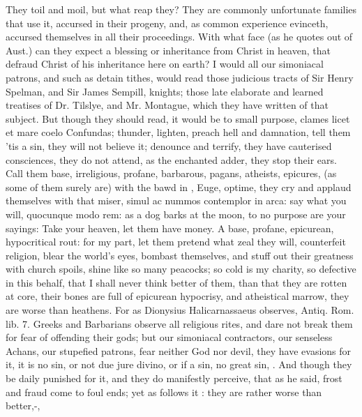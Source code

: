 {They toil and moil, but what reap they? They are commonly unfortunate
families that use it, accursed in their pro\-geny, and, as common
experience evinceth, accursed themselves in all their proceedings. With
what face (as he quotes out of Aust.) can they expect a blessing
or inheritance from Christ in heaven, that defraud Christ of his
inheritance here on earth? I would all our simoniacal patrons, and such
as detain tithes, would read those judicious tracts of Sir Henry
Spelman, and Sir James Sempill, knights; those late elaborate and
learned treatises of Dr. Tilslye, and Mr. Montague, which they have
written of that subject. But though they should read, it would be to
small purpose, clames licet et mare coelo Confundas; thunder, lighten,
preach hell and damnation, tell them 'tis a sin, they will not believe
it; denounce and terrify, they have cauterised consciences, they
do not attend, as the enchanted adder, they stop their ears. Call them
base, irreligious, profane, barbarous, pagans, atheists, epicures, (as
some of them surely are) with the bawd in \Plautus{}, Euge, optime, they
cry and applaud themselves with that miser, simul ac nummos
contemplor in arca: say what you will, quocunque modo rem: as a dog
barks at the moon, to no purpose are your sayings: Take your heaven,
let them have money. A base, profane, epicurean, hypocritical rout: for
my part, let them pretend what zeal they will, counterfeit religion,
blear the world's eyes, bombast themselves, and stuff out their
greatness with church spoils, shine like so many peacocks; so cold is
my charity, so defective in this behalf, that I shall never think
better of them, than that they are rotten at core, their bones are full
of epicurean hypocrisy, and atheistical marrow, they are worse than
heathens. For as Dionysius Halicarnassaeus observes, Antiq. Rom. lib.
7.  Greeks and Barbarians observe all religious
rites, and dare not break them for fear of offending their gods; but
our simoniacal contractors, our senseless Achans, our stupefied
patrons, fear neither God nor devil, they have evasions for it, it is
no sin, or not due jure divino, or if a sin, no great sin, \etc{}. And
though they be daily punished for it, and they do manifestly perceive,
that as he said, frost and fraud come to foul ends; yet as
\Chrysostom{} follows it :
they are rather worse than better,-,
}
